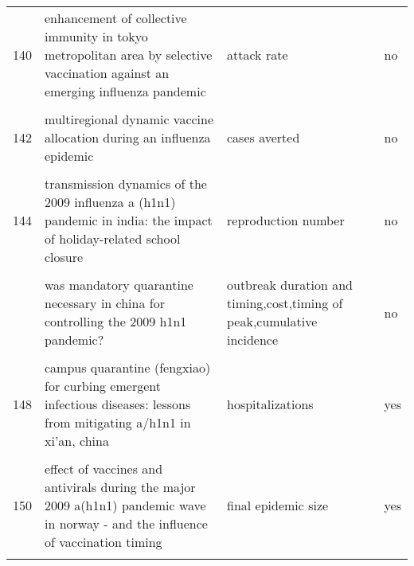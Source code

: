 \documentclass[
]{article}
\begin{document}
\begin{landscape}
\begin{longtable}{l>{\raggedright\arraybackslash}p{4cm}>{\raggedright\arraybackslash}p{6cm}l}
140 & enhancement of collective immunity in tokyo metropolitan area by selective vaccination against an emerging influenza pandemic & attack rate & no\\
\addlinespace
\cellcolor{gray!6}{141} & \cellcolor{gray!6}{estimated impact of aggressive empirical antiviral treatment in containing an outbreak of pandemic influenza h1n1 in an isolated first nations community} & \cellcolor{gray!6}{cases averted,intervention coverage,attack rate} & \cellcolor{gray!6}{no}\\
142 & multiregional dynamic vaccine allocation during an influenza epidemic & cases averted & no\\
\cellcolor{gray!6}{143} & \cellcolor{gray!6}{policies to reduce influenza in the workplace: impact assessments using an agent-based model} & \cellcolor{gray!6}{final epidemic size,attack rate} & \cellcolor{gray!6}{yes}\\
144 & transmission dynamics of the 2009 influenza a (h1n1) pandemic in india: the impact of holiday-related school closure & reproduction number & no\\
\cellcolor{gray!6}{145} & \cellcolor{gray!6}{vaccination against foot-and-mouth disease: do initial conditions affect its benefit?} & \cellcolor{gray!6}{intervention coverage} & \cellcolor{gray!6}{yes}\\
\addlinespace
146 & was mandatory quarantine necessary in china for controlling the 2009 h1n1 pandemic? & outbreak duration and timing,cost,timing of peak,cumulative incidence & no\\
\cellcolor{gray!6}{147} & \cellcolor{gray!6}{a contact-network-based simulation model for evaluating interventions under 'what-if' scenarios in epidemic} & \cellcolor{gray!6}{attack rate,peak incidence,peak day} & \cellcolor{gray!6}{no}\\
148 & campus quarantine (fengxiao) for curbing emergent infectious diseases: lessons from mitigating a/h1n1 in xi'an, china & hospitalizations & yes\\
\cellcolor{gray!6}{149} & \cellcolor{gray!6}{dynamic modelling of costs and health consequences of school closure during an influenza pandemic} & \cellcolor{gray!6}{attack rate,qualys} & \cellcolor{gray!6}{yes}\\
150 & effect of vaccines and antivirals during the major 2009 a(h1n1) pandemic wave in norway - and the influence of vaccination timing & final epidemic size & yes\\
\addlinespace
\cellcolor{gray!6}{151} & \cellcolor{gray!6}{estimating the value of containment strategies in delaying the arrival time of an influenza pandemic: a case study of travel restriction and patient isolation} & \cellcolor{gray!6}{first arrival time} & \cellcolor{gray!6}{no}\\

\end{longtable}
\end{landscape}
\end{document}
